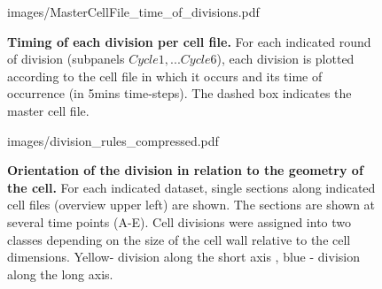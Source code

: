 \documentclass[11pt,a4paper, final]{article}
\begin{document}
%
\begin{figure}[htbp]
	\begin{center}
	\begin{overpic}[width=.66\linewidth]{images/MasterCellFile_time_of_divisions.pdf}
	\end{overpic}
\caption[Timing of each division per cell file.]
{{\bf Timing of each division per cell file.} For each indicated round of division (subpanels $Cycle 1, ... Cycle 6$), each division is plotted according to the cell file in which it occurs and its time of occurrence (in 5mins time-steps). The dashed box indicates the master cell file.}
	\label{fig:mastertimediv}
	\end{center}
\end{figure}
%
\clearpage


%
\begin{figure}[htbp]
	\begin{overpic}[width=1.\linewidth]{images/division_rules_compressed.pdf}
	\end{overpic}
\caption[Orientation of the division in relation to the geometry of the cell.]
{{\bf Orientation of the division in relation to the geometry of the cell.} For each indicated dataset, single sections along indicated cell files (overview upper left) are shown. The sections are shown at several time points (A-E). Cell divisions were assigned into two classes depending on the size of the cell wall relative to the cell dimensions. Yellow- division along the short axis , blue - division along the long axis. }
	\label{fig:divrules}
\end{figure}
%
\clearpage
\end{document}
